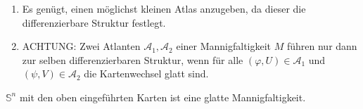 \begin{rem*}
	\begin{enumerate}[label = {\roman*})]
		\item Es genügt, einen möglichst kleinen Atlas anzugeben, da dieser die differenzierbare Struktur festlegt.
		\item ACHTUNG: Zwei Atlanten $ \mathcal{A}_1,\mathcal{A}_2 $ einer Mannigfaltigkeit $M$ führen nur dann zur selben differenzierbaren Struktur, wenn für alle $ (\varphi,U) \in \mathcal{A}_1 $ und $ (\psi,V) \in \mathcal{A}_2 $ die Kartenwechsel glatt sind.
	\end{enumerate}
\end{rem*}

\begin{exmp*}
	$ \mathbb{S}^n $ mit den oben eingeführten Karten ist eine glatte Mannigfaltigkeit.
\end{exmp*}
	
